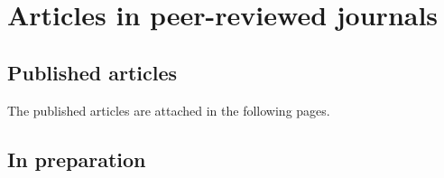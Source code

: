 \chapter{Articles in peer-reviewed journals}
            
\section*{Published articles}


The published articles are attached in the following pages.

\begin{refsection}%
\nocite{*}
\printbibliography[keyword=publicado,heading=none] %
\end{refsection}%

\section*{In preparation}






%